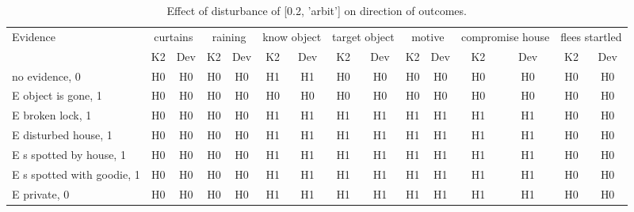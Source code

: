 \begin{table}\begin{tabular}{l|cc|cc|cc|cc|cc|cc|cc}\toprule\multirow{2}{*}{Evidence} & \multicolumn{2}{c}{curtains}& \multicolumn{2}{c}{raining}& \multicolumn{2}{c}{know object}& \multicolumn{2}{c}{target object}& \multicolumn{2}{c}{motive}& \multicolumn{2}{c}{compromise house}& \multicolumn{2}{c}{flees startled}\\& {K2} & {Dev}& {K2} & {Dev}& {K2} & {Dev}& {K2} & {Dev}& {K2} & {Dev}& {K2} & {Dev}& {K2} & {Dev}\\\midrule
no evidence, 0 & H0&H0&H0&H0&H1&H1&H0&H0&H0&H0&H0&H0&H0&H0\\E object is gone, 1 & H0&H0&H0&H0&H0&H0&H0&H0&H0&H0&H0&H0&H0&H0\\E broken lock, 1 & H0&H0&H0&H0&H1&H1&H1&H1&H1&H1&H1&H1&H0&H0\\E disturbed house, 1 & H0&H0&H0&H0&H1&H1&H1&H1&H1&H1&H1&H1&H0&H0\\E s spotted by house, 1 & H0&H0&H0&H0&H1&H1&H1&H1&H1&H1&H1&H1&H0&H0\\E s spotted with goodie, 1 & H0&H0&H0&H0&H1&H1&H1&H1&H1&H1&H1&H1&H0&H0\\E private, 0 & H0&H0&H0&H0&H1&H1&H1&H1&H1&H1&H1&H1&H0&H0\\\bottomrule\end{tabular}\caption{Effect of disturbance of [0.2, 'arbit'] on direction of outcomes.}\end{table}
